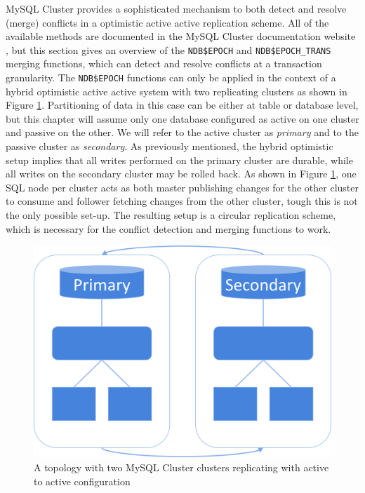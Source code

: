 MySQL Cluster provides a sophisticated mechanism to both detect and resolve (merge) conflicts in a optimistic active active replication scheme.
All of the available methods are documented in the MySQL Cluster documentation website \cite{mysql-cluster-documentation-replication}, but this section gives an overview of the \texttt{NDB\$EPOCH} and \texttt{NDB\$EPOCH\_TRANS} merging functions, which can detect and resolve conflicts at a transaction granularity.
The \texttt{NDB\$EPOCH} functions can only be applied in the context of a hybrid optimistic active active system with two replicating clusters as shown in Figure \ref{fig:two-active-active-clusters}.
Partitioning of data in this case can be either at table or database level, but this chapter will assume only one database configured as active on one cluster and passive on the other.
We will refer to the active cluster as \emph{primary} and to the passive cluster as \emph{secondary}.
As previously mentioned, the hybrid optimistic setup implies that all writes performed on the primary cluster are durable, while all writes on the secondary cluster may be rolled back.
As shown in Figure \ref{fig:two-active-active-clusters}, one SQL node per cluster acts as both master publishing changes for the other cluster to consume and follower fetching changes from the other cluster, tough this is not the only possible set-up.
The resulting setup is a circular replication scheme, which is necessary for the conflict detection and merging functions to work.

\begin{figure}[h]
\caption{A topology with two MySQL Cluster clusters replicating with active to active configuration}
\label{fig:two-active-active-clusters}
\centering
\includegraphics[width=1.0\textwidth]{images/hops-active-active.png}
\end{figure}


